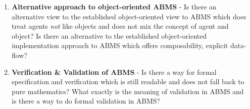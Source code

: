 \begin{enumerate}
	\item \textbf{Alternative approach to object-oriented ABMS} - Is there an alternative view to the established object-oriented view to ABMS which does treat agents \textit{not} like objects and does not mix the concept of agent and object? Is there an alternative to the established object-oriented implementation approach to ABMS which offers composability, explicit data-flow?
	\item \textbf{Verification \& Validation of ABMS} - Is there a way for formal specification and verification which is still readable and does not fall back to pure mathematics? What exactly is the meaning of validation in ABMS and is there a way to do formal validation in ABMS? 
\end{enumerate}